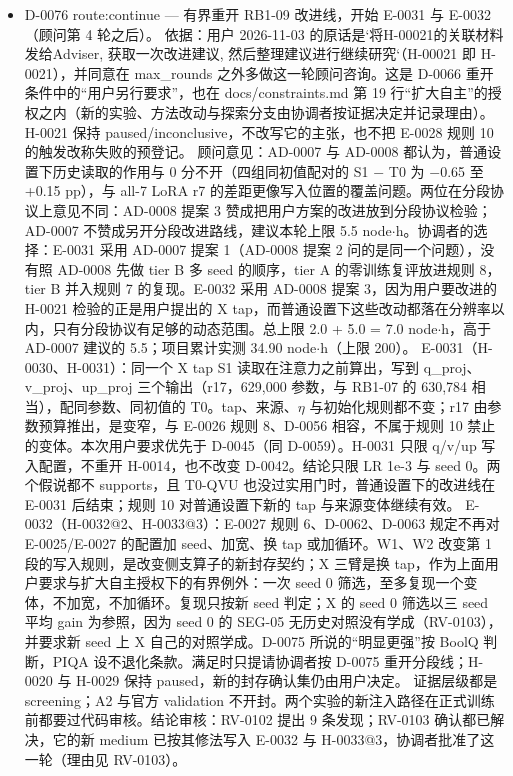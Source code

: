\documentclass[11pt]{article}
\begin{document}
\begin{itemize}
\item D-0076 route:continue --- 有界重开 RB1-09 改进线，开始 E-0031 与 E-0032（顾问第 4 轮之后）。 依据：用户 2026-11-03 的原话是`将H-00021的关联材料发给Adviser, 获取一次改进建议, 然后整理建议进行继续研究`（H-00021 即 H-0021），并同意在 max\_rounds 之外多做这一轮顾问咨询。这是 D-0066 重开条件中的``用户另行要求''，也在 docs/constraints.md 第 19 行``扩大自主''的授权之内（新的实验、方法改动与探索分支由协调者按证据决定并记录理由）。H-0021 保持 paused/inconclusive，不改写它的主张，也不把 E-0028 规则 10 的触发改称失败的预登记。 顾问意见：AD-0007 与 AD-0008 都认为，普通设置下历史读取的作用与 0 分不开（四组同初值配对的 S1 \ensuremath{-} T0 为 \ensuremath{-}0.65 至 +0.15 pp），与 all-7 LoRA r7 的差距更像写入位置的覆盖问题。两位在分段协议上意见不同：AD-0008 提案 3 赞成把用户方案的改进放到分段协议检验；AD-0007 不赞成另开分段改进路线，建议本轮上限 5.5 node\ensuremath{\cdot}h。协调者的选择：E-0031 采用 AD-0007 提案 1（AD-0008 提案 2 问的是同一个问题），没有照 AD-0008 先做 tier B 多 seed 的顺序，tier A 的零训练复评放进规则 8，tier B 并入规则 7 的复现。E-0032 采用 AD-0008 提案 3，因为用户要改进的 H-0021 检验的正是用户提出的 X tap，而普通设置下这些改动都落在分辨率以内，只有分段协议有足够的动态范围。总上限 2.0 + 5.0 = 7.0 node\ensuremath{\cdot}h，高于 AD-0007 建议的 5.5；项目累计实测 34.90 node\ensuremath{\cdot}h（上限 200）。 E-0031（H-0030、H-0031）：同一个 X tap S1 读取在注意力之前算出，写到 q\_proj、v\_proj、up\_proj 三个输出（r17，629,000 参数，与 RB1-07 的 630,784 相当），配同参数、同初值的 T0。tap、来源、\ensuremath{\eta} 与初始化规则都不变；r17 由参数预算推出，是变窄，与 E-0026 规则 8、D-0056 相容，不属于规则 10 禁止的变体。本次用户要求优先于 D-0045（同 D-0059）。H-0031 只限 q/v/up 写入配置，不重开 H-0014，也不改变 D-0042。结论只限 LR 1e-3 与 seed 0。两个假说都不 supports，且 T0-QVU 也没过实用门时，普通设置下的改进线在 E-0031 后结束；规则 10 对普通设置下新的 tap 与来源变体继续有效。 E-0032（H-0032@2、H-0033@3）：E-0027 规则 6、D-0062、D-0063 规定不再对 E-0025/E-0027 的配置加 seed、加宽、换 tap 或加循环。W1、W2 改变第 1 段的写入规则，是改变侧支算子的新封存契约；X 三臂是换 tap，作为上面用户要求与扩大自主授权下的有界例外：一次 seed 0 筛选，至多复现一个变体，不加宽，不加循环。复现只按新 seed 判定；X 的 seed 0 筛选以三 seed 平均 gain 为参照，因为 seed 0 的 SEG-05 无历史对照没有学成（RV-0103），并要求新 seed 上 X 自己的对照学成。D-0075 所说的``明显更强''按 BoolQ 判断，PIQA 设不退化条款。满足时只提请协调者按 D-0075 重开分段线；H-0020 与 H-0029 保持 paused，新的封存确认集仍由用户决定。 证据层级都是 screening；A2 与官方 validation 不开封。两个实验的新注入路径在正式训练前都要过代码审核。结论审核：RV-0102 提出 9 条发现；RV-0103 确认都已解决，它的新 medium 已按其修法写入 E-0032 与 H-0033@3，协调者批准了这一轮（理由见 RV-0103）。

\end{itemize}
\end{document}
